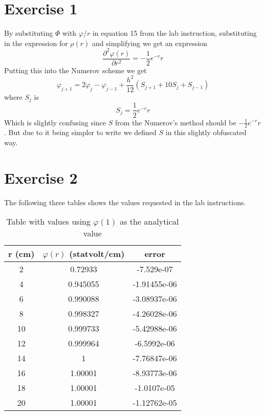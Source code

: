 \documentclass[11pt]{article}
\begin{document}
\section{Exercise 1}
By substituting $\Phi$ with $\varphi/r$ in equation 15 from the lab instruction, substituting in the expression for $\rho(r)$ and simplifying we get an expression
\begin{equation}
\frac{\partial^2 \varphi(r)}{\partial r^2} = -\frac{1}{2} e^{-r}r
\end{equation}
Putting this into the Numerov scheme we get
\begin{equation}
	\varphi_{j+1} = 2 \varphi_j - \varphi_{j-1} + \frac{h^2}{12} (S_{j+1} + 10S_j +S_{j-1})
\end{equation}
where $S_j$ is 
\begin{equation}
	S_j = \frac{1}{2}e^{-r}r
\end{equation}
Which is slightly confusing since $S$ from the Numerov's method should be $-\frac{1}{2}e^{-r}r$. But due to it being simpler to write we defined $S$ in this slightly obfuscated way. 


\section{Exercise 2}
The following three tables shows the values requested in the lab instructions.
\begin{table}[h]
\center
\caption{Table with values using $\varphi(1)$ as the analytical value}
\begin{tabular}{c|c|c}
r (cm) & $\varphi(r)$ (statvolt/cm) & error \\ \hline
2 & 0.72933 & -7.529e-07 \\ \hline 
4 & 0.945055 & -1.91455e-06 \\ \hline 
6 & 0.990088 & -3.08937e-06 \\ \hline 
8 & 0.998327 & -4.26028e-06 \\ \hline 
10 & 0.999733 & -5.42988e-06 \\ \hline 
12 & 0.999964 & -6.5992e-06 \\ \hline 
14 & 1 & -7.76847e-06 \\ \hline 
16 & 1.00001 & -8.93773e-06 \\ \hline 
18 & 1.00001 & -1.0107e-05 \\ \hline 
20 & 1.00001 & -1.12762e-05 \\ 
\end{tabular}
\end{table}
\end{document}
